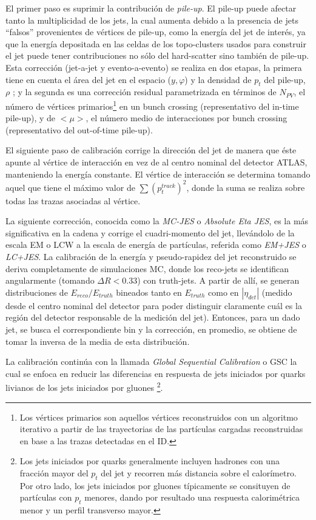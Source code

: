 El primer paso es suprimir la contribución de \textit{pile-up}. El pile-up puede afectar tanto la multiplicidad de los jets, la cual aumenta debido a la presencia de jets ``falsos'' provenientes de vértices de pile-up, como la energía del jet de interés, ya que la energía depositada en las celdas de los topo-clusters usados para construir el jet puede tener contribuciones no sólo del hard-scatter sino también de pile-up. Esta corrección (jet-a-jet y evento-a-evento) se realiza en dos etapas, la primera tiene en cuenta el área del jet en el espacio ($y,\varphi$) y la densidad de $p_t$ del pile-up, $\rho$ \cite{PileUpArea}; y la segunda es una corrección residual parametrizada en términos de $N_{PV}$, el número de vértices primarios\footnote{Los vértices primarios son aquellos vértices reconstruidos con un algoritmo iterativo \cite{NPV} a partir de las trayectorias de las partículas cargadas reconstruidas en base a las trazas detectadas en el ID.} en un bunch crossing (representativo del in-time pile-up), y de $<\mu>$, el número medio de interacciones por bunch crossing (representativo del out-of-time pile-up).

El siguiente paso de calibración corrige la dirección del jet de manera que éste apunte al vértice de interacción en vez de al centro nominal del detector ATLAS, manteniendo la energía constante. El vértice de interacción se determina tomando aquel que tiene el máximo valor de $\sum (p_t^{track})^2$, donde la suma se realiza sobre todas las trazas asociadas al vértice.

La siguiente corrección, conocida como la \textit{MC-JES} o \textit{Absolute Eta JES}, es la más significativa en la cadena y corrige el cuadri-momento del jet, llevándolo de la escala EM o LCW a la escala de energía de partículas, referida como \textit{EM+JES} o \textit{LC+JES}. La calibración de la energía y pseudo-rapidez del jet reconstruido se deriva completamente de simulaciones MC, donde los reco-jets se identifican angularmente (tomando $\Delta R<$0.33) con truth-jets. A partir de allí, se generan distribuciones de $E_{reco}/E_{truth}$ bineados tanto en $E_{truth}$ como en $|\eta_{det}|$ (medido desde el centro nominal del detector para poder distinguir claramente cuál es la región del detector responsable de la medición del jet). Entonces, para un dado jet, se busca el correspondiente bin y la corrección, en promedio, se obtiene de tomar la inversa de la media de esta distribución. 

La calibración continúa con la llamada \textit{Global Sequential Calibration} o GSC la cual se enfoca en reducir las diferencias en respuesta de jets iniciados por quarks livianos de los jets iniciados por gluones \footnote{Los jets iniciados por quarks generalmente incluyen hadrones con una fracción mayor del $p_t$ del jet y recorren más distancia sobre el calorímetro. Por otro lado, los jets iniciados por gluones típicamente se consituyen de partículas con $p_t$ menores, dando por resultado una respuesta calorimétrica menor y un perfil transverso mayor.}. 

